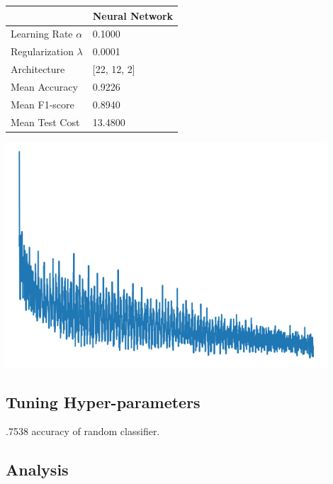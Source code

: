 \documentclass{article}
\begin{document}
\begin{minipage}{0.49\textwidth}
    \centering
    
    \begin{tabular}{ll}
        \toprule
        & Neural Network \\
        \midrule
        Learning Rate $\alpha$ & 0.1000 \\
        Regularization $\lambda$ & 0.0001 \\
        Architecture & [22, 12, 2] \\
        Mean Accuracy & 0.9226 \\
        Mean F1-score & 0.8940 \\
        Mean Test Cost & 13.4800 \\
        \bottomrule
    \end{tabular}

        
\end{minipage}
\hfill
\begin{minipage}{0.49\textwidth}
    \centering
    \includegraphics*[width=0.9\textwidth]{./src/figures/Parikinson's_train_cost.png}
\end{minipage}
\subsection*{Tuning Hyper-parameters}
.7538 accuracy of random classifier.

\subsection*{Analysis}
\end{document}
